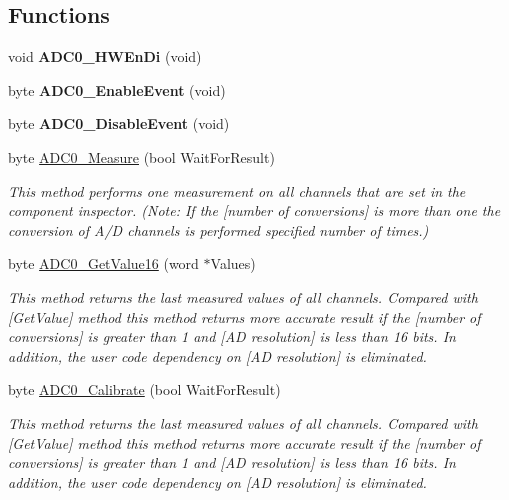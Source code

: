 \subsection*{Functions}
\begin{DoxyCompactItemize}
\item 
\mbox{\label{group___a_d_c0__module_gac6f9124e6b7e682edbd773ee3076c150}} 
void {\bfseries A\+D\+C0\+\_\+\+H\+W\+En\+Di} (void)
\item 
\mbox{\label{group___a_d_c0__module_gad424b93830ce76270da42eac7982718e}} 
byte {\bfseries A\+D\+C0\+\_\+\+Enable\+Event} (void)
\item 
\mbox{\label{group___a_d_c0__module_ga028d05a75dc089dc7c55118bdbea0d64}} 
byte {\bfseries A\+D\+C0\+\_\+\+Disable\+Event} (void)
\item 
byte \hyperlink{group___a_d_c0__module_ga711a227f91b11ab087311d7a4f596323}{A\+D\+C0\+\_\+\+Measure} (bool Wait\+For\+Result)
\begin{DoxyCompactList}\small\item\em This method performs one measurement on all channels that are set in the component inspector. (Note\+: If the \mbox{[}number of conversions\mbox{]} is more than one the conversion of A/D channels is performed specified number of times.) \end{DoxyCompactList}\item 
byte \hyperlink{group___a_d_c0__module_ga60e325e636a51cf5c40b1ae5d887571e}{A\+D\+C0\+\_\+\+Get\+Value16} (word $\ast$Values)
\begin{DoxyCompactList}\small\item\em This method returns the last measured values of all channels. Compared with \mbox{[}Get\+Value\mbox{]} method this method returns more accurate result if the \mbox{[}number of conversions\mbox{]} is greater than 1 and \mbox{[}AD resolution\mbox{]} is less than 16 bits. In addition, the user code dependency on \mbox{[}AD resolution\mbox{]} is eliminated. \end{DoxyCompactList}\item 
byte \hyperlink{group___a_d_c0__module_gae338cdea1f89e3ae9bcac5801ebadcf8}{A\+D\+C0\+\_\+\+Calibrate} (bool Wait\+For\+Result)
\begin{DoxyCompactList}\small\item\em This method returns the last measured values of all channels. Compared with \mbox{[}Get\+Value\mbox{]} method this method returns more accurate result if the \mbox{[}number of conversions\mbox{]} is greater than 1 and \mbox{[}AD resolution\mbox{]} is less than 16 bits. In addition, the user code dependency on \mbox{[}AD resolution\mbox{]} is eliminated. \end{DoxyCompactList}\item 

\end{DoxyCompactItemize}
